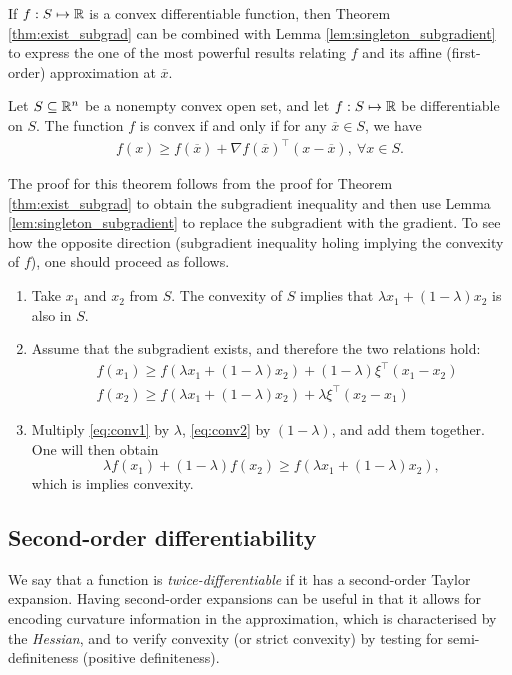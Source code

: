 If $f:S \mapsto \mathbb{R}$ is a convex differentiable function, then Theorem \ref{thm:exist_subgrad} can be combined with Lemma \ref{lem:singleton_subgradient} to express the one of the most powerful results relating $f$ and its affine (first-order) approximation at $\overline{x}$.
%
\begin{theorem}\label{thm:convex_affine_bound}
	Let $S \subseteq \mathbb{R}^n$ be a nonempty convex open set, and let $f:S \mapsto \mathbb{R}$ be differentiable on $S$. The function $f$ is convex if and only if for any $\overline{x} \in S$, we have
	\begin{align*}
		f(x) \geq f(\overline{x}) + \nabla f(\overline{x})^\top(x - \overline{x}), ~\forall x \in S.
	\end{align*}
\end{theorem}
%
The proof for this theorem follows from the proof for Theorem \ref{thm:exist_subgrad} to obtain the subgradient inequality and then use Lemma \ref{lem:singleton_subgradient} to replace the subgradient with the gradient. To see how the opposite direction (subgradient inequality holing implying the convexity of $f$), one should proceed as follows. 
\begin{enumerate}
	\item Take $x_1$ and $x_2$ from $S$. The convexity of $S$ implies that $\lambda x_1 + (1-\lambda)x_2$ is also in $S$.
	\item Assume that the subgradient exists, and therefore the two relations hold:
	\begin{align}
		& f(x_1) \ge f(\lambda x_1 + (1-\lambda )x_2) + (1-\lambda )\xi^\top (x_1- x_2) \label{eq:conv1} \\
		& f(x_2) \ge f(\lambda x_1 + (1-\lambda )x_2) + \lambda \xi^\top (x_2- x_1) \label{eq:conv2}
	 \end{align}
	 \item Multiply \eqref{eq:conv1} by $\lambda$, \eqref{eq:conv2} by $(1-\lambda)$, and add them together. One will then obtain
	$$\lambda f(x_1) + (1-\lambda)f(x_2) \ge f(\lambda x_1 + (1-\lambda )x_2),$$ which is implies convexity.	 
\end{enumerate}



\subsection{Second-order differentiability}

 
We say that a function is \emph{twice-differentiable} if it has a second-order Taylor expansion. Having second-order expansions can be useful in that it allows for encoding curvature information in the approximation, which is characterised by the \emph{Hessian}, and to verify convexity (or strict convexity) by testing for semi-definiteness (positive definiteness).


